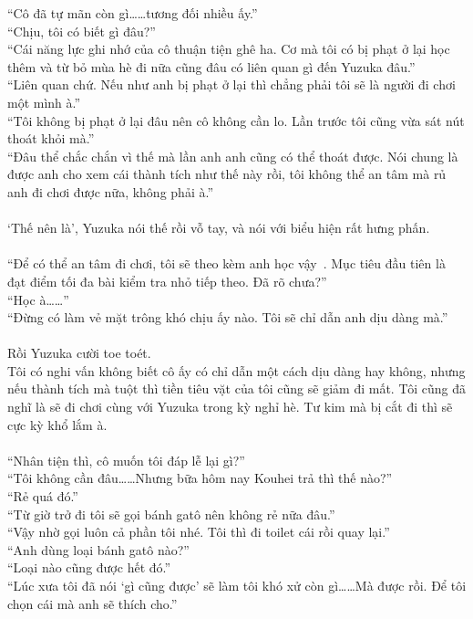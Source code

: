 \documentclass[12pt,a4paper, twosides]{book}
\begin{document}
“Cô đã tự mãn còn gì……tương đối nhiều ấy.”\\
“Chịu, tôi có biết gì đâu?”\\
“Cái năng lực ghi nhớ của cô thuận tiện ghê ha. Cơ mà tôi có bị phạt ở lại học thêm và từ bỏ mùa hè đi nữa cũng đâu có liên quan gì đến Yuzuka đâu.”\\
“Liên quan chứ. Nếu như anh bị phạt ở lại thì chẳng phải tôi sẽ là người đi chơi một mình à.”\\
“Tôi không bị phạt ở lại đâu nên cô không cần lo. Lần trước tôi cũng vừa sát nút thoát khỏi mà.”\\
“Đâu thể chắc chắn vì thế mà lần anh anh cũng có thể thoát được. Nói chung là được anh cho xem cái thành tích như thế này rồi, tôi không thể an tâm mà rủ anh đi chơi được nữa, không phải à.”\\
\\
‘Thế nên là’, Yuzuka nói thế rồi vỗ tay, và nói với biểu hiện rất hưng phấn.\\
\\
“Để có thể an tâm đi chơi, tôi sẽ theo kèm anh học vậy~. Mục tiêu đầu tiên là đạt điểm tối đa bài kiểm tra nhỏ tiếp theo. Đã rõ chưa?”\\
“Học à……”\\
“Đừng có làm vẻ mặt trông khó chịu ấy nào. Tôi sẽ chỉ dẫn anh dịu dàng mà.”\\
\\
Rồi Yuzuka cười toe toét.\\
Tôi có nghi vấn không biết cô ấy có chỉ dẫn một cách dịu dàng hay không, nhưng nếu thành tích mà tuột thì tiền tiêu vặt của tôi cũng sẽ giảm đi mất. Tôi cũng đã nghĩ là sẽ đi chơi cùng với Yuzuka trong kỳ nghỉ hè. Tư kim mà bị cắt đi thì sẽ cực kỳ khổ lắm à.\\
\\
“Nhân tiện thì, cô muốn tôi đáp lễ lại gì?”\\
“Tôi không cần đâu……Nhưng bữa hôm nay Kouhei trả thì thế nào?”\\
“Rẻ quá đó.”\\
“Từ giờ trở đi tôi sẽ gọi bánh gatô nên không rẻ nữa đâu.”\\
“Vậy nhờ gọi luôn cả phần tôi nhé. Tôi thì đi toilet cái rồi quay lại.”\\
“Anh dùng loại bánh gatô nào?”\\
“Loại nào cũng được hết đó.”\\
“Lúc xưa tôi đã nói ‘gì cũng được’ sẽ làm tôi khó xử còn gì……Mà được rồi. Để tôi chọn cái mà anh sẽ thích cho.”\\
\end{document}
